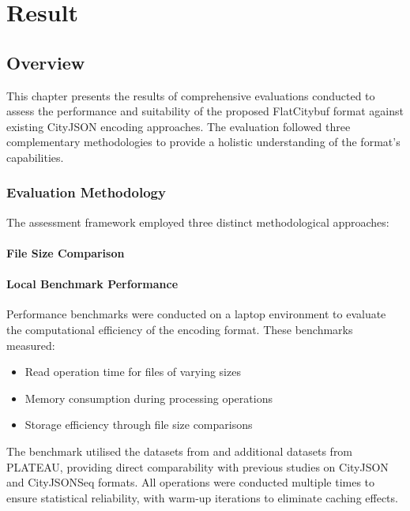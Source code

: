 \chapter{Result}
\label{chp:result}

\section{Overview}
\label{result:overview}

This chapter presents the results of comprehensive evaluations conducted to assess the performance and suitability of the proposed FlatCitybuf format against existing CityJSON encoding approaches. The evaluation followed three complementary methodologies to provide a holistic understanding of the format's capabilities.



\subsection{Evaluation Methodology}
\label{result:overview:evaluation_methodology}

The assessment framework employed three distinct methodological approaches:

\subsubsection{File Size Comparison}
\label{result:overview:file_size_comparison}



\subsubsection{Local Benchmark Performance}
\label{result:overview:local_benchmark_performance}

Performance benchmarks were conducted on a laptop environment to evaluate the computational efficiency of the encoding format. These benchmarks measured:
\begin{itemize}
  \item Read operation time for files of varying sizes
  \item Memory consumption during processing operations
  \item Storage efficiency through file size comparisons
\end{itemize}

The benchmark utilised the datasets from \citet{ledoux_2024} and additional datasets from PLATEAU, providing direct comparability with previous studies on CityJSON and CityJSONSeq formats. All operations were conducted multiple times to ensure statistical reliability, with warm-up iterations to eliminate caching effects.


